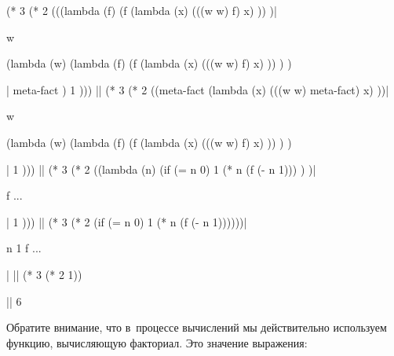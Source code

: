 \begin{code:lisp}
(* 3 (* 2 (((lambda (f)
              (f (lambda (x)
                   (((w w) f) x) )) )|\begin{where}
                                      \- w {\eq} \begin{complex}
                                                \-(lambda (w)
                                                \-  (lambda (f)
                                                \-    (f (lambda (x)
                                                \-         (((w w) f) x) )) ) )
                                                \end{complex}
                                      \end{where}|
            meta-fact )
           1 )))
|\Equals|   (* 3 (* 2 ((meta-fact (lambda (x)
                           (((w w) meta-fact) x) ))|\begin{where}
                                                    \- w {\eq} \begin{complex*}{4.5cm}
                                                              \-(lambda (w)
                                                              \-  (lambda (f)
                                                              \-    (f (lambda (x)
                                                              \-         (((w w) f) x) )) ) )
                                                              \end{complex*}
                                                    \end{where}|
              1 )))
|\Equals|   (* 3 (* 2 ((lambda (n)
                (if (= n 0) 1
                    (* n (f (- n 1))) ) )|\begin{where}
                                          \- f {\is} ...
                                          \end{where}|
              1 )))
|\Equals|   (* 3 (* 2 (if (= n 0) 1 (* n (f (- n 1))))))|\begin{where}
                                                         \- n {\is} 1
                                                         \- f {\is} ...
                                                         \end{where}|
|\Equals|   (* 3 (* 2 1))

|\is| 6
\end{code:lisp}

Обратите внимание, что в~процессе вычислений мы действительно используем
функцию, вычисляющую факториал. Это значение выражения:

